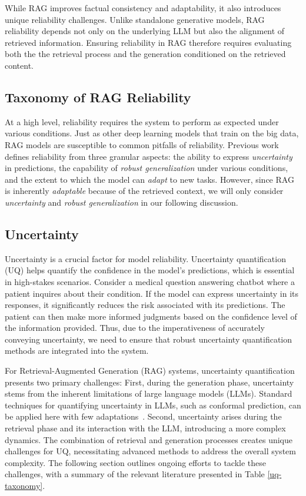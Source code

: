 While RAG improves factual consistency and adaptability, it also introduces unique reliability challenges. Unlike standalone generative models, RAG reliability depends not only on the underlying LLM but also the alignment of retrieved information. Ensuring reliability in RAG therefore requires evaluating both the the retrieval process and the generation conditioned on the retrieved content.

\subsection{Taxonomy of RAG Reliability}
At a high level, reliability requires the system to perform as expected under various conditions. Just as other deep learning models that train on the big data, RAG models are susceptible to common pitfalls of reliability. Previous work~\cite{tran2022plex} defines reliability from three granular aspects: the ability to express \textit{uncertainty} in predictions, the capability of \textit{robust generalization} under various conditions, and the extent to which the model can \textit{adapt} to new tasks. However, since RAG is inherently \textit{adaptable} because of the retrieved context, we will only consider \textit{uncertainty} and \textit{robust generalization} in our following discussion. 

\subsection{Uncertainty}
Uncertainty is a crucial factor for model reliability. Uncertainty quantification (UQ) helps quantify the
confidence in the model's predictions, which is essential in high-stakes
scenarios. Consider a medical question answering chatbot where a patient
inquires about their condition. If the model can express uncertainty in its
responses, it significantly reduces the risk associated with its predictions.
The patient can then make more informed judgments based on the confidence level
of the information provided. Thus, due to the imperativeness of accurately
conveying uncertainty, we need to ensure that robust uncertainty quantification
methods are integrated into the system. 

For Retrieval-Augmented Generation (RAG) systems, uncertainty quantification
presents two primary challenges: First, during the generation phase, uncertainty
stems from the inherent limitations of large language models (LLMs). Standard
techniques for quantifying uncertainty in LLMs, such as conformal prediction,
can be applied here with few adaptations~\cite{ye2024benchmarkingllmsuncertaintyquantification}. Second, uncertainty arises during the
retrieval phase and its interaction with the LLM, introducing a more complex
dynamics. The combination of retrieval and generation processes creates unique
challenges for UQ, necessitating advanced methods to
address the overall system complexity. The following section outlines ongoing
efforts to tackle these challenges, with a summary of the relevant literature
presented in Table \ref{uq-taxonomy}.

